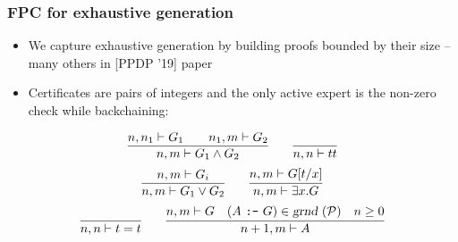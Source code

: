\documentclass{beamer}
\newcommand{\red}[1]{{\color{red} #1}}
\newcommand{\trueExpert }[1]{{\true_e}(#1)}
\newcommand{\eqExpert }[1]{{=_e}(#1)}
\newcommand{\andExpert}[3]{{\wedge_e}(#1,#2,#3)}
\newcommand{\orExpert  }[3]{{\vee_e}(#1,#2,#3)}
\newcommand{\someExpert}[3]{\exists_e(#1,#2,#3)}
\newcommand{\true}{tt}
\newcommand{\XXi}{{\color{blue}{\Xi}}}
\begin{document}
\begin{frame}
  \frametitle{FPC for exhaustive generation}
  \begin{itemize}
  \item We capture exhaustive generation by building proofs bounded by their 
    size -- many others in [PPDP '19] paper
  \item Certificates are pairs of integers and the only active expert
    is the non-zero check while backchaining: 

 \end{itemize}
 \[
\infer{n,m\vdash G_1\wedge G_2}
{n,n_1\vdash G_1\qquad n_1,m\vdash G_2 %
}
\qquad
\infer{n,n\vdash \true}
{
}
\]
\vskip -6pt
\[
\infer{n,m\vdash G_1\vee G_2}
{n,m\vdash G_i%
}
\qquad
\infer{n,m\vdash \exists x. G}
{n,m\vdash G[t/x]%
}
\]
\vskip -6pt
\[
\infer{n,n\vdash t = t}
{
}
\qquad
\infer{n + 1,m\vdash A}
      {n,m\vdash G \quad (A~\hbox{\tt :-}~G)\in\instan\Pscr
                     \quad n \geq 0}
\]

\end{frame}



\end{document}
